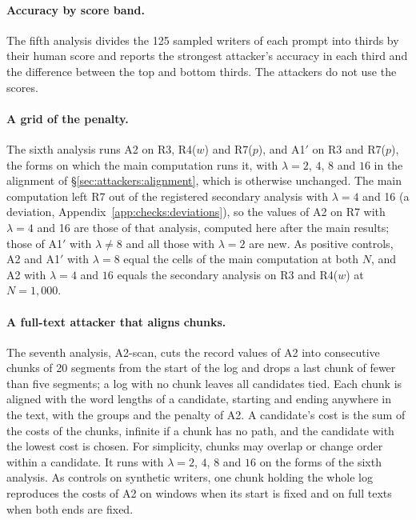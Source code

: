 \paragraph{Accuracy by score band.}
The fifth analysis divides the 125 sampled writers of each prompt into thirds by their human score and reports the strongest
attacker's accuracy in each third and the difference between the top and bottom thirds. The attackers do not use the
scores.

\paragraph{A grid of the penalty.}
The sixth analysis runs A2 on R3, R4($w$) and R7($p$), and A1$'$ on R3 and R7($p$), the forms on which the main
computation runs it, with $\lambda = 2$, $4$, $8$ and $16$ in the alignment of \S\ref{sec:attackers:alignment}, which is
otherwise unchanged. The main computation left R7 out of the registered secondary analysis with $\lambda = 4$ and 16 (a deviation,
Appendix~\ref{app:checks:deviations}), so the values of A2 on R7 with $\lambda = 4$ and 16 are those of that analysis, computed here after the main
results; those of A1$'$ with $\lambda \neq 8$ and all those with $\lambda = 2$ are new. As positive controls, A2 and A1$'$ with $\lambda = 8$ equal the cells of the main
computation at both $N$, and A2 with $\lambda = 4$ and $16$ equals the secondary analysis on R3 and R4($w$) at
$N = 1{,}000$.

\paragraph{A full-text attacker that aligns chunks.}
The seventh analysis, A2-scan, cuts the record values of A2 into consecutive chunks of 20 segments from the start of
the log and drops a last chunk of fewer than five segments; a log with no chunk leaves all candidates tied. Each chunk
is aligned with the word lengths of a candidate, starting and ending anywhere in the text, with the groups and the
penalty of A2. A candidate's cost is the sum of the costs of the chunks, infinite if a chunk has no path, and the
candidate with the lowest cost is chosen. For simplicity, chunks may overlap or change order within a candidate. It
runs with $\lambda = 2$, $4$, $8$ and $16$ on the forms of the sixth analysis. As controls on synthetic writers, one
chunk holding the whole log reproduces the costs of A2 on windows when its start is fixed and on full texts when both
ends are fixed.

